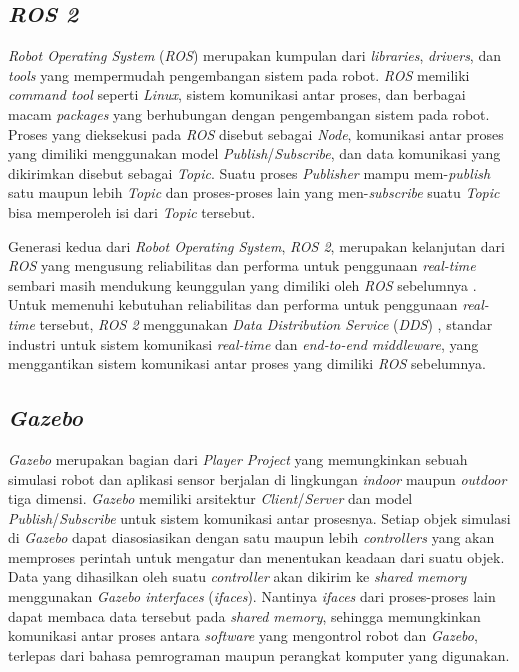 \subsection{\emph{ROS 2}}

\emph{Robot Operating System} (\emph{ROS}) \citep{Quigley2009} merupakan kumpulan dari \emph{libraries}, \emph{drivers}, dan \emph{tools} yang mempermudah pengembangan sistem pada robot.
\emph{ROS} memiliki \emph{command tool} seperti \emph{Linux}, sistem komunikasi antar proses, dan berbagai macam \emph{packages} yang berhubungan dengan pengembangan sistem pada robot.
Proses yang dieksekusi pada \emph{ROS} disebut sebagai \emph{Node}, komunikasi antar proses yang dimiliki menggunakan model \emph{Publish}/\emph{Subscribe}, dan data komunikasi yang dikirimkan disebut sebagai \emph{Topic}.
Suatu proses \emph{Publisher} mampu mem-\emph{publish} satu maupun lebih \emph{Topic} dan proses-proses lain yang men-\emph{subscribe} suatu \emph{Topic} bisa memperoleh isi dari \emph{Topic} tersebut.

Generasi kedua dari \emph{Robot Operating System}, \emph{ROS 2}, merupakan kelanjutan dari \emph{ROS} yang mengusung reliabilitas dan performa untuk penggunaan \emph{real-time} sembari masih mendukung keunggulan yang dimiliki oleh \emph{ROS} sebelumnya \citep{Maruyama2016}.
Untuk memenuhi kebutuhan reliabilitas dan performa untuk penggunaan \emph{real-time} tersebut, \emph{ROS 2} menggunakan \emph{Data Distribution Service} (\emph{DDS}) \citep{Castellote2003} \citep{Schlesselman2004}, standar industri untuk sistem komunikasi \emph{real-time} dan \emph{end-to-end middleware}, yang menggantikan sistem komunikasi antar proses yang dimiliki \emph{ROS} sebelumnya.

\subsection{\emph{Gazebo}}

\emph{Gazebo} \citep{Koenig2004} merupakan bagian dari \emph{Player Project} \citep{Gerkey2003} yang memungkinkan sebuah simulasi robot dan aplikasi sensor berjalan di lingkungan \emph{indoor} maupun \emph{outdoor} tiga dimensi.
\emph{Gazebo} memiliki arsitektur \emph{Client}/\emph{Server} dan model \emph{Publish}/\emph{Subscribe} untuk sistem komunikasi antar prosesnya.
Setiap objek simulasi di \emph{Gazebo} dapat diasosiasikan dengan satu maupun lebih \emph{controllers} yang akan memproses perintah untuk mengatur dan menentukan keadaan dari suatu objek.
Data yang dihasilkan oleh suatu \emph{controller} akan dikirim ke \emph{shared memory} menggunakan \emph{Gazebo interfaces} (\emph{ifaces}).
Nantinya \emph{ifaces} dari proses-proses lain dapat membaca data tersebut pada \emph{shared memory}, sehingga memungkinkan komunikasi antar proses antara \emph{software} yang mengontrol robot dan \emph{Gazebo}, terlepas dari bahasa pemrograman maupun perangkat komputer yang digunakan.